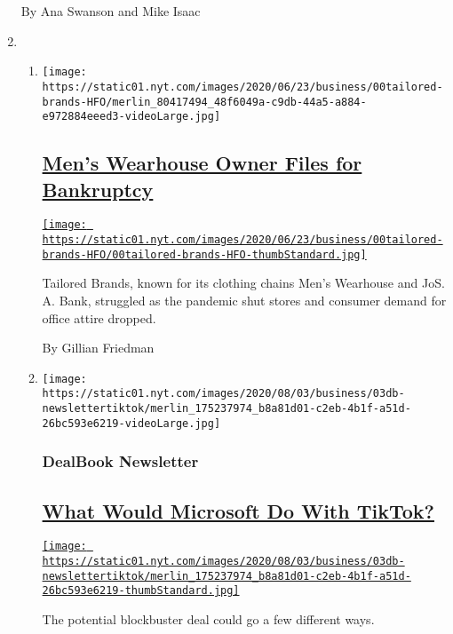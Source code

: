 \begin{enumerate}
  By Ana Swanson and Mike Isaac
\item
  \begin{enumerate}
  \def\labelenumii{\arabic{enumii}.}
  \item
    \texttt{[image: https://static01.nyt.com/images/2020/06/23/business/00tailored-brands-HFO/merlin\_80417494\_48f6049a-c9db-44a5-a884-e972884eeed3-videoLarge.jpg]}

    \hypertarget{mens-wearhouse-owner-files-for-bankruptcy}{%
    \subsection{\texorpdfstring{\href{/2020/08/03/business/tailored-brands-mens-wearhouse-bankruptcy.html}{Men's
    Wearhouse Owner Files for
    Bankruptcy}}{Men's Wearhouse Owner Files for Bankruptcy}}\label{mens-wearhouse-owner-files-for-bankruptcy}}

    \href{/2020/08/03/business/tailored-brands-mens-wearhouse-bankruptcy.html}{\texttt{[image: https://static01.nyt.com/images/2020/06/23/business/00tailored-brands-HFO/00tailored-brands-HFO-thumbStandard.jpg]}}

    Tailored Brands, known for its clothing chains Men's Wearhouse and
    JoS. A. Bank, struggled as the pandemic shut stores and consumer
    demand for office attire dropped.

    By Gillian Friedman
  \item
    \texttt{[image: https://static01.nyt.com/images/2020/08/03/business/03db-newslettertiktok/merlin\_175237974\_b8a81d01-c2eb-4b1f-a51d-26bc593e6219-videoLarge.jpg]}

    \hypertarget{dealbook-newsletter}{%
    \subsubsection{DealBook Newsletter}\label{dealbook-newsletter}}

    \hypertarget{what-would-microsoft-do-with-tiktok}{%
    \subsection{\texorpdfstring{\href{/2020/08/03/business/dealbook/tiktok-microsoft-takeover.html}{What
    Would Microsoft Do With
    TikTok?}}{What Would Microsoft Do With TikTok?}}\label{what-would-microsoft-do-with-tiktok}}

    \href{/2020/08/03/business/dealbook/tiktok-microsoft-takeover.html}{\texttt{[image: https://static01.nyt.com/images/2020/08/03/business/03db-newslettertiktok/merlin\_175237974\_b8a81d01-c2eb-4b1f-a51d-26bc593e6219-thumbStandard.jpg]}}

    The potential blockbuster deal could go a few different ways.
  \end{enumerate}
\end{enumerate}

